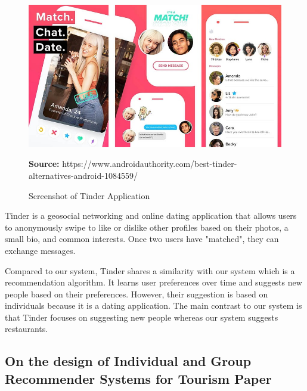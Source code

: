 \documentclass[12pt,oneside,openright,a4paper]{cpe-english-project}
\newcommand*{\captionsource}[2]{%
  \caption[{#1}]{#1}\vspace{-8pt}
  \textbf{Source:} #2}
\begin{document}
\begin{figure}[H]\centering
\includegraphics[width=400pt]{./images/2tinder.jpeg}
\label{fig:2tinder}
\captionsource{Screenshot of Tinder Application}{https://www.androidauthority.com/best-tinder-alternatives-android-1084559/}
\end{figure}\vspace{-24pt}
\vspace{1em}

Tinder is a geosocial networking and online dating application that allows users to anonymously swipe to like or dislike other profiles based on their photos, a small bio, and common interests. Once two users have "matched", they can exchange messages. \cite{Tinderapp}

Compared to our system, Tinder shares a similarity with our system which is a recommendation algorithm. It learns user preferences over time and suggests new people based on their preferences. However, their suggestion is based on individuals because it is a dating application.  The main contrast to our system is that Tinder focuses on suggesting new people whereas our system suggests restaurants.

\newpage
\subsection{On the design of Individual and Group Recommender Systems for Tourism Paper}
\end{document}
